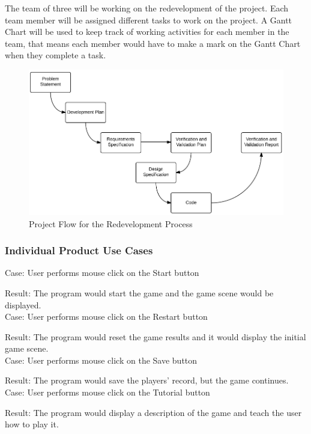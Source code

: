 \documentclass[12pt,letterpaper]{article}
\begin{document}
\noindent The team of three will be working on the redevelopment of the project. Each team member will be assigned different tasks to work on the project. A Gantt Chart will be used to keep track of working activities for each member in the team, that means each member would have to make a mark on the Gantt Chart when they complete a task. \\

\begin{figure}[h]
  \includegraphics[scale=0.6]{ProjectFlow.png}
  \caption{Project Flow for the Redevelopment Process}
\end{figure}

\subsubsection{Individual Product Use Cases}
	Case: User performs mouse click on the Start button

Result: The program would start the game and the game scene would be displayed.\\

Case: User performs mouse click on the Restart button

Result: The program would reset the game results and it would display the initial game scene.\\

Case: User performs mouse click on the Save button

Result:  The program would save the players’ record, but the game continues. \\

Case: User performs mouse click on the Tutorial button

Result: The program would display a description of the game and teach the user how to play it.\\
\end{document}
